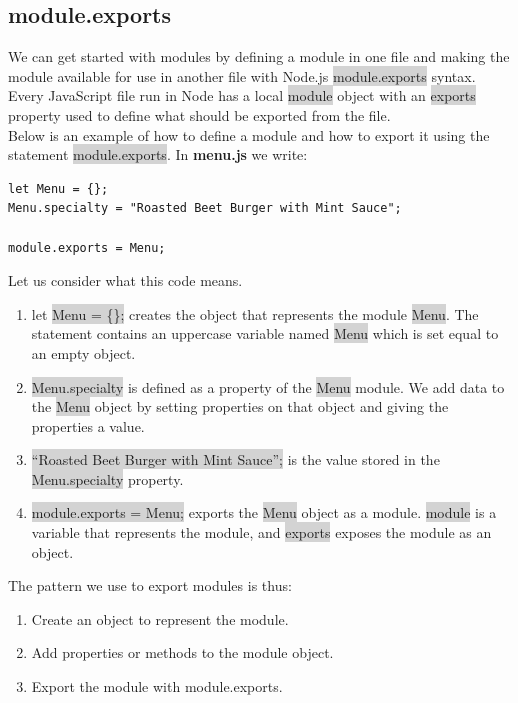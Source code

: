 \documentclass[11pt]{article}
\begin{document}
\subsection{module.exports}
We can get started with modules by defining a module in one file and making the module available for use in another file with Node.js \colorbox{lightgray}{module.exports} syntax. Every JavaScript file run in Node has a local \colorbox{lightgray}{module} object with an \colorbox{lightgray}{exports} property used to define what should be exported from the file. \\
\newline
Below is an example of how to define a module and how to export it using the statement \colorbox{lightgray}{module.exports}. In \textbf{menu.js} we write:
\begin{lstlisting}
let Menu = {};
Menu.specialty = "Roasted Beet Burger with Mint Sauce";

module.exports = Menu; 
\end{lstlisting}
Let us consider what this code means.
\begin{enumerate}[leftmargin = *]
\item let \colorbox{lightgray}{Menu = \{\};} creates the object that represents the module \colorbox{lightgray}{Menu}. The statement contains an uppercase variable named \colorbox{lightgray}{Menu} which is set equal to an empty object.
\item \colorbox{lightgray}{Menu.specialty} is defined as a property of the \colorbox{lightgray}{Menu} module. We add data to the \colorbox{lightgray}{Menu} object by setting properties on that object and giving the properties a value.
\item \colorbox{lightgray}{``Roasted Beet Burger with Mint Sauce'';} is the value stored in the \colorbox{lightgray}{Menu.specialty} property.
\item \colorbox{lightgray}{module.exports = Menu;} exports the \colorbox{lightgray}{Menu} object as a module. \colorbox{lightgray}{module} is a variable that represents the module, and \colorbox{lightgray}{exports} exposes the module as an object.
\end{enumerate}
The pattern we use to export modules is thus:
\begin{enumerate}[leftmargin = *]
\item Create an object to represent the module.
\item Add properties or methods to the module object.
\item Export the module with module.exports.
\end{enumerate}
\end{document}
